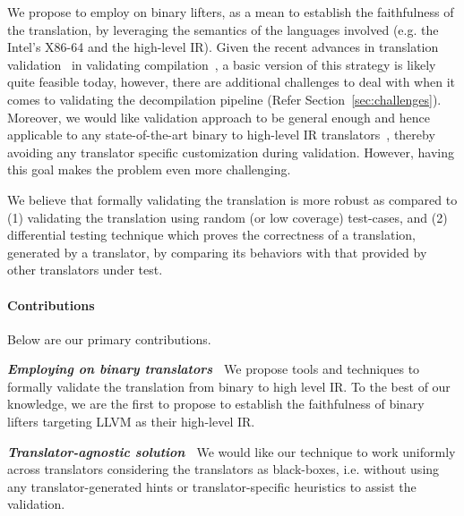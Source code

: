 We propose to employ \tv on binary lifters, as a mean to establish the
faithfulness of the translation, by leveraging the semantics of the languages
involved (e.g. the Intel's X86-64 and the high-level IR).  Given the recent
advances in translation validation~\cite{Pnueli:1998} in validating
compilation~\cite{Necula:2000,Pnueli:1998,Stepp:2011,Tristan:2011,VOC2002,TVOC:CAV2005},
  a basic version of this strategy is likely quite feasible today, however,
  there are additional challenges to deal with when it comes to validating the
  decompilation pipeline (Refer Section~\ref{sec:challenges}). Moreover, we
  would like validation approach to be general enough and hence applicable to
  any state-of-the-art binary to high-level IR
  translators~\cite{McSema:Recon14,Remill,FCD,reopt,llvm-mctoll,BAP:CAV11,Angr1},
  thereby avoiding any translator specific customization during validation.
  However, having this goal makes the problem even more challenging.

We believe that formally validating the translation is more robust as compared
to (1) validating the translation using random (or low coverage) test-cases,
   and (2) differential testing technique which proves the correctness of a
   translation, generated by a translator, by comparing its behaviors with that
   provided by other translators under test. 

\paragraph{Contributions}
Below are our primary contributions.

\textbf{\emph{Employing \tv on binary translators~}} We propose tools and
techniques to formally validate the translation from binary to high level IR.
To the best of our knowledge, we are the first to propose \tv to establish the
faithfulness of binary lifters targeting LLVM as their high-level IR.

\textbf{\emph{Translator-agnostic solution~}} We would like our technique to
work uniformly across translators considering the translators as black-boxes,
     i.e. without using any translator-generated hints  or translator-specific
     heuristics to assist the validation.


